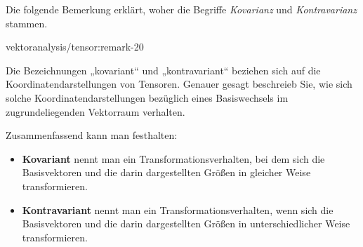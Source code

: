 \par
Die folgende Bemerkung erklärt, woher die Begriffe \emph{Kovarianz} und \emph{Kontravarianz} stammen.
\begin{remark}{}{vektoranalysis/tensor:remark-20}



\par
Die Bezeichnungen „kovariant“ und „kontravariant“ beziehen sich auf die Koordinatendarstellungen von Tensoren.
Genauer gesagt beschreieb Sie, wie sich solche Koordinatendarstellungen bezüglich eines Basiswechsels im zugrundeliegenden Vektorraum verhalten.

\par
Zusammenfassend kann man festhalten:
\begin{itemize}
\item {} 
\par
\textbf{Kovariant} nennt man ein Transformationsverhalten, bei dem sich die Basisvektoren und die darin dargestellten Größen in gleicher Weise transformieren.

\item {} 
\par
\textbf{Kontravariant} nennt man ein Transformationsverhalten, wenn sich die Basisvektoren und die darin dargestellten Größen in unterschiedlicher Weise transformieren.

\end{itemize}
\end{remark}

